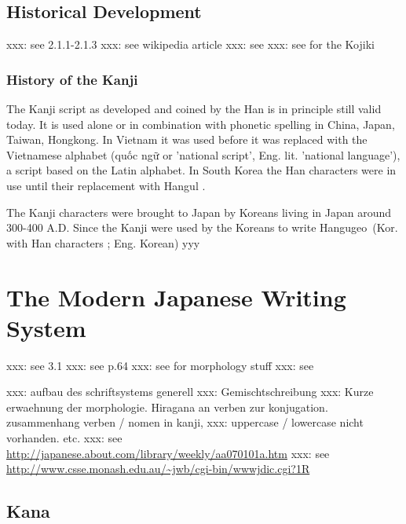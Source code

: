 \subsection{Historical Development}
\label{sec:historicaldevelopmentofjapanesescript}
xxx: see  2.1.1-2.1.3
xxx: see wikipedia article
xxx: see 
xxx: see  for the Kojiki

\subsubsection{History of the Kanji}
\label{sec:historyofthekanji}

The Kanji script as developed and coined by the Han is in principle still valid 
today. It is used alone or in combination with phonetic spelling in China, Japan,
Taiwan, Hongkong. In Vietnam it was used before it was replaced with the 
Vietnamese alphabet (quốc ngữ or 'national script', Eng. lit. 'national 
language'), a script based on the Latin alphabet. In South Korea the Han characters were in use until their replacement with Hangul .

The Kanji characters were brought to Japan by Koreans living in Japan around 
300-400 A.D. Since the Kanji were used by the Koreans to write 
Hangugeo~(Kor. with Han characters ; Eng. Korean)
yyy




\section{The Modern Japanese Writing System}
\label{sec:modernjapanesewritingsystem}

xxx: see  3.1
xxx: see  p.64
xxx: see  for morphology stuff
xxx: see 

xxx: aufbau des schriftsystems generell
xxx: Gemischtschreibung
xxx: Kurze erwaehnung der morphologie. Hiragana an verben zur konjugation.
     zusammenhang verben / nomen in kanji, 
xxx: uppercase / lowercase nicht vorhanden. etc.
xxx: see \url{http://japanese.about.com/library/weekly/aa070101a.htm}
xxx: see \url{http://www.csse.monash.edu.au/~jwb/cgi-bin/wwwjdic.cgi?1R}

\subsection{Kana }
\label{sec:kana}

